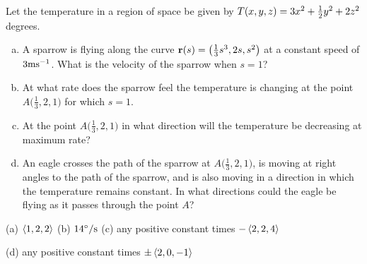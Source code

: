 \begin{question}[M200 2001D] %
Let the temperature in a region of space be given by 
$T(x,y,z)=3x^2+\tfrac{1}{2} y^2+2z^2$ degrees.
\begin{enumerate}[(a)]
\item
A sparrow is flying along the curve $\mathbf{r}(s)=\big(\frac{1}{3}s^3,2s,s^2\big)$
at a constant speed of $3{\rm ms}^{-1}$. What is the velocity of the sparrow
when $s=1$?

\item
At what rate does the sparrow feel the temperature is changing
at the point $A\big(\frac{1}{3},2,1\big)$ for which $s=1$.

\item
At the point $A\big(\frac{1}{3},2,1\big)$ in what direction
will the temperature be decreasing at maximum rate?

\item
 An eagle crosses the path of the sparrow 
at $A\big(\frac{1}{3},2,1\big)$, is moving at right angles to the path
of the sparrow, and is also moving in a direction in which the temperature
remains constant. In what directions could the eagle be flying as it passes
through the point $A$?
\end{enumerate}
\end{question}

%

\begin{answer}
(a) $\left< 1,2,2\right>$\qquad
(b) $14^\circ/{\rm s}$\qquad
(c) any positive constant times $-\left< 2,2,4\right>$

(d) any positive constant times $\pm\left< 2,0,-1\right>$
\end{answer}

